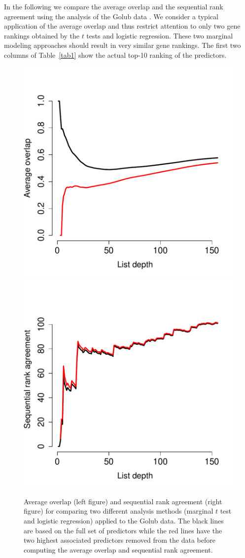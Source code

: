 \documentclass[12pt,a4paper]{article}
\theoremstyle{plain}
\begin{document}
In the following we compare the average overlap and the sequential
rank agreement using the analysis of the Golub data
\citep{Golub1999}. We consider a typical application of the average
overlap and thus restrict attention to only two gene rankings obtained
by the $t$ tests and logistic regression. These two marginal modeling
approaches should result in very similar gene rankings. The first two
columns of Table~\ref{tab1} show the actual top-10 ranking of the
predictors.



\begin{figure}[htbp]
\begin{center}
\includegraphics[width=.49\textwidth]{paper-fig-ao1}
\includegraphics[width=.49\textwidth]{paper-fig-ao2}
\end{center}
 \caption{Average overlap (left figure) and sequential rank agreement
 (right figure) for comparing two different analysis methods
 (marginal $t$ test and logistic regression)
    applied to the Golub data. The black lines are based on the full
    set of predictors while the red lines have the two highest
    associated predictors removed
    from the data before computing the average overlap and sequential
    rank agreement.}
  \label{fig:case1}
 \end{figure}
\end{document}
